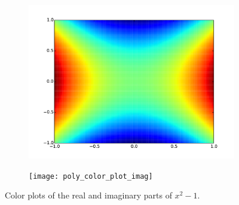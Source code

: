\begin{figure}
\begin{subfigure}{.49\textwidth}
\includegraphics[width=\textwidth]{poly_color_plot_real}
\end{subfigure}
\begin{subfigure}{.49\textwidth}
\texttt{[image: poly\_color\_plot\_imag]}
\end{subfigure}
\caption{Color plots of the real and imaginary parts of $x^2 - 1$.}
\label{fig:poly_color_plot}
\end{figure}

